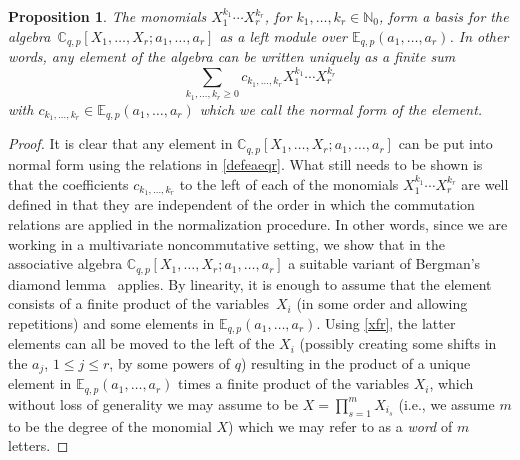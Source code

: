\documentclass[10pt,a4paper]{amsart}
\numberwithin{equation}{section}
\newtheorem{Proposition}[Theorem]{Proposition}
\theoremstyle{definition}
\newcommand{\C}{\mathbb C}
\newcommand{\E}{\mathbb E}
\newcommand{\N}{\mathbb N}
\begin{document}
\begin{Proposition}\label{prop}
The monomials $X_1^{k_1}\cdots X_r^{k_r}$,
for $k_1,\dots,k_r\in\N_0$, form a \textit{basis} for the
algebra~${\C_{q,p}[X_1,\dots,X_r;a_1,\dots,a_r]}$
as a left module over $\E_{q,p}(a_1,\dots,a_r)$.
In other words, any element of the algebra can be written uniquely
as a finite sum
\[
\sum_{k_1,\dots,k_r\ge 0} c_{k_1,\dots,k_r}X_1^{k_1}\cdots X_r^{k_r}
\]
with $c_{k_1,\dots,k_r}\in \E_{q,p}(a_1,\dots,a_r)$ which
we call the \textit{normal form} of the element.
\end{Proposition}
\begin{proof}
It is clear that any element in
$\C_{q,p}[X_1,\dots,X_r;a_1,\dots,a_r]$
can be put into normal form using the relations in \eqref{defeaeqr}.
What still needs to be shown is that the coefficients $c_{k_1,\dots,k_r}$ to the left of each of the
monomials $X_1^{k_1}\cdots X_r^{k_r}$ are well defined in that
they are independent of the order in which the commutation relations
are applied in the normalization procedure.
In other words, since we are working in a multivariate
noncommutative setting, we show that in the associative algebra
$\C_{q,p}[X_1,\dots,X_r;a_1,\dots,a_r]$ a suitable
variant of Bergman's diamond lemma~\cite{B} applies.
By linearity, it is enough to assume that the element consists
of a finite product of the variables~$X_i$ (in some order and
allowing repetitions) and some elements in
$\E_{q,p}(a_1,\dots,a_r)$. Using \eqref{xfr},
the latter elements can all be moved
to the left of the $X_i$ (possibly creating some shifts in the
$a_j$, $1\le j\le r$, by some powers of $q$) resulting in the
product of a unique element in $\E_{q,p}(a_1,\dots,a_r)$ times
a finite product of the variables $X_i$, which without loss
of generality we may assume to be $X=\prod_{s=1}^m X_{i_s}$
(i.e., we assume $m$ to be the degree of the monomial $X$)
which we may refer to as a \textit{word} of $m$ letters.


\end{proof}
\end{document}
